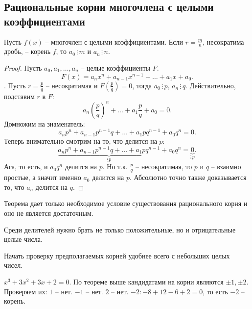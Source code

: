 \documentclass[12pt, a4paper]{article}
\begin{document}
    \subsection{Рациональные корни многочлена с целыми коэффициентами}
    \begin{theorem}
        Пусть \( f(x) \) -- многочлен с целыми коэффициентами. Если \( r = \frac{m}{n} \), несократима дробь, -- корень \( f \), то \(a_{0} \, \vdots \, m \) и \( a_{n} \, \vdots  \,n \).
    \end{theorem}
    \begin{proof}
        Пусть \( a_{0}, a_{1}, \ldots , a_{n} \) -- целые коэффициенты \( F \). \[
            F(x) = a_{n}x^{n} + a_{n-1}x^{n-1} + \ldots  + a_{1}x + a_{0}  .
        \]. Пусть \( r = \frac{p}{q} \) -- несократимая и \( F(\frac{p}{q}) = 0 \), тогда \( a_{0} \, \vdots \, p, \, a_{n} \, \vdots \, q \). Действительно, подставим \( r \) в \( F \):
        \[
            a_{n}\left( \frac{p}{q} \right) ^{n} + \ldots + a_{1} \frac{p}{q} + a_{0} = 0.
        \] Домножим на знаменатель: \[
            a_{n}p^{n} + a_{n-1}p^{n-1}q + \ldots  + a_{1}pq^{n-1} + a_{0}q^{n} = 0.
        \]Теперь внимательно смотрим на то, что делится на \( p \): \[
        \underbrace{a_{n}p^{n} + a_{n-1}p^{n-1}q + \ldots  + a_{1}pq^{n-1}}_{\vdots \, p} + a_{0}q^{n} = \underbrace{0}_{\vdots\, p}.
        \]Ага, то есть, и \( a_{0}q^{n}  \) делится на \( p \). Но т.к. \( \frac{p}{q} \)  -- несократимая, то \( p \) и \( q \) -- взаимно простые, а значит именно \( a_{0} \) делится на \( p \). Абсолютно точно также доказывается то, что \( a_{n} \) делится на \( q \).
        
    \end{proof}
    \begin{rem}
        Теорема дает только необходимое условие существования рационального корня и оно не является достаточным.
    \end{rem}
    \begin{rem}
        Среди делителей нужно брать не только положительные, но и отрицательные целые числа.
    \end{rem}
    \begin{rem}
        Начать проверку предполагаемых корней удобнее всего с небольших целых чисел.
    \end{rem}
    \begin{exmp}
        \( x^3 + 3x^2 + 3x + 2 = 0 \).
        По теореме выше кандидатами на корни являются \( \pm 1, \pm 2 \). Проверяем их: \( 1 \) -- нет. \( -1 \) -- нет. \( 2 \) -- нет. \( -2: -8 + 12 - 6 + 2 = 0 \), то есть \( -2 \) -- корень.
    \end{exmp}
\end{document}

